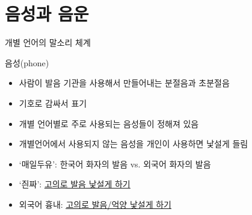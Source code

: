 \documentclass[11pt, aspectratio=169]{beamer}
\newcommand{\textds}[1]{{\ipafont #1}}
\begin{document}
\section{음성과 음운}

\begin{frame}[t]{개별 언어의 말소리 체계}
    \begin{block}{음성(phone)}
        \begin{itemize}
            \item 사람이 발음 기관을 사용해서 만들어내는 분절음과 초분절음
            \item \textds{[ ]} 기호로 감싸서 표기
            \item 개별 언어별로 주로 사용되는 음성들이 정해져 있음
            \item 개별언어에서 사용되지 않는 음성을 개인이 사용하면 낯설게 들림
        \end{itemize}
    \end{block}
    \begin{itemize}
        \item ‘매일두유’: 한국어 화자의 발음 vs. 외국어 화자의 발음
        \item ‘즨짜’:  \href{https://youtu.be/FB6jrxNt6Qk}{\underline{고의로 발음 낯설게 하기}}
        \item 외국어 흉내: \href{https://youtu.be/ASoG_iqQZMs?t=640}{\underline{고의로 발음/억양 낯설게 하기}}
    \end{itemize}
\end{frame}
\end{document}
